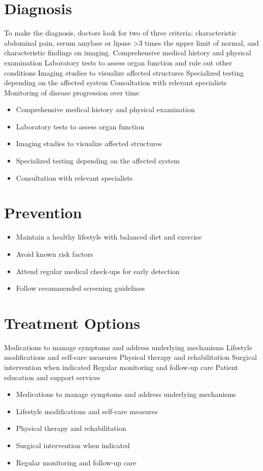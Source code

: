 \section{Diagnosis}
To make the diagnosis, doctors look for two of three criteria: characteristic abdominal pain, serum amylase or lipase >3 times the upper limit of normal, and characteristic findings on imaging. Comprehensive medical history and physical examination Laboratory tests to assess organ function and rule out other conditions Imaging studies to visualize affected structures Specialized testing depending on the affected system Consultation with relevant specialists Monitoring of disease progression over time

\begin{itemize}[noitemsep]
  \item Comprehensive medical history and physical examination
  \item Laboratory tests to assess organ function
  \item Imaging studies to visualize affected structures
  \item Specialized testing depending on the affected system
  \item Consultation with relevant specialists
\end{itemize}
\section{Prevention}
\begin{itemize}[noitemsep]
  \item Maintain a healthy lifestyle with balanced diet and exercise
  \item Avoid known risk factors
  \item Attend regular medical check-ups for early detection
  \item Follow recommended screening guidelines
\end{itemize}
\section{Treatment Options}
Medications to manage symptoms and address underlying mechanisms Lifestyle modifications and self-care measures Physical therapy and rehabilitation Surgical intervention when indicated Regular monitoring and follow-up care Patient education and support services

\begin{itemize}[noitemsep]
  \item Medications to manage symptoms and address underlying mechanisms
  \item Lifestyle modifications and self-care measures
  \item Physical therapy and rehabilitation
  \item Surgical intervention when indicated
  \item Regular monitoring and follow-up care
\end{itemize}
